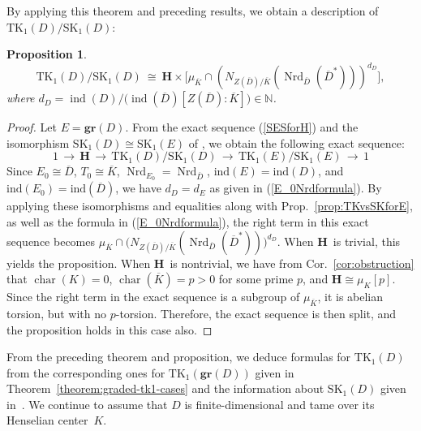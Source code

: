 \documentclass[11pt]{article}
\numberwithin{equation}{section}
\theoremstyle{plain}
\newtheorem{proposition}[theorem]{Proposition}
\theoremstyle{remark}
\newcommand{\gr}{\mathbf{gr}}
\newcommand{\opn}{\operatorname}
\newcommand{\SK}{\opn{SK_1}}
\newcommand{\TK}{\opn{TK_1}}
\newcommand{\Nrd}{\opn{Nrd}}
\newcommand{\nn}{\mathbb N}
\newcommand{\ind}{\text{ind}}
\newcommand{\charr}{\opn{char}}
\newcommand{\ov}{\overline}
\newcommand{\bH}{\mathbf{H}}
\begin{document}
By applying this theorem and preceding results, we obtain a description of  
$\TK(D)/\SK(D)$:

\begin{proposition} 
\label{prop:TKvsSKforD}
$$
\TK(D)/\SK(D)\  \cong \ \bH\times 
 \big[\mu_{\ov K} \cap (N_{Z(\ov D)/\ov K}(\Nrd_{\ov D}(\ov D^*)))^{d_D} \big],
$$ 
where $d_D = \opn{ind}(D)\big/\big(\opn{ind}(\ov D)[Z(\ov D): \ov K]\big) \in \nn$.
\end{proposition} 

\begin{proof}
Let $E =\gr(D)$.  From the exact sequence (\ref{SESforH}) and the isomorphism $\SK(D) \cong \SK(E)$
of \cite[Th.~4.8]{hazrat-wadsworth-2011}, we obtain the following exact sequence:
$$
1\, \longrightarrow \, \bH \, \longrightarrow \, \TK(D)/\SK(D)\, \longrightarrow \, 
\TK(E)/\SK(E)\, \longrightarrow \, 1
$$
Since $E_0 \cong \ov D$, $T_0 \cong \ov K$, $\Nrd_{E_0} = \Nrd_{\ov D}$, $\ind (E) = \ind(D)$, and 
$\ind(E_0) = \ind(\ov D)$,
we have $d_D = d_E$ as given in (\ref{E_0Nrdformula}).  By applying these isomorphisms and equalities along with  Prop.~\ref{prop:TKvsSKforE},
as well as the formula in (\ref{E_0Nrdformula}), 
 the right term in this exact sequence becomes 
 $\mu_{\ov K} \cap\big(N_{Z(\ov D)/\ov K}(\Nrd_{\ov D}(\ov D^*))\big)^{d_D}$.
 When $\bH$~is trivial, this yields the proposition.  When $\bH$~is nontrivial, we have from Cor.~\ref{cor:obstruction}
 that $\charr(K) = 0$, $\charr(\ov K) = p > 0$ for some prime $p$, and $\bH \cong\mu_K[p]$.  Since the right term in the 
 exact sequence is a subgroup of $\mu_{\ov K}$, it is abelian torsion, but with no $p$-torsion.  Therefore, the exact
 sequence is then split, and the proposition holds in this case also. 
\end{proof}

From the preceding theorem and proposition, we  deduce formulas for  $\TK(D)$ from 
the corresponding ones for $\TK(\gr(D))$ given in 
Theorem~\ref{theorem:graded-tk1-cases} and the information about $\SK(D)$ given 
in~\cite{hazrat-wadsworth-2011}.  We continue to assume that $D$ is finite-dimensional and  tame over its 
Henselian center~$K$.
   
\end{document}
